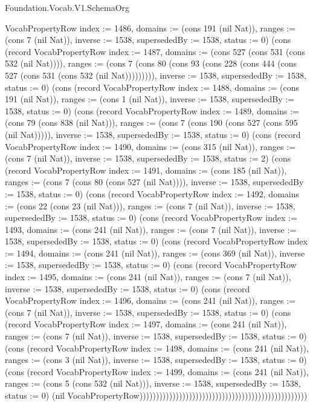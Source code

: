 \begin{lexlean}{Foundation.Vocab.V1.SchemaOrg}
\begin{semanticmodule}
{VocabPropertyRow {index := 1486, domains := (cons 191 (nil Nat)), ranges := (cons 7 (nil Nat)), inverse := 1538, supersededBy := 1538, status := 0}) (cons (record VocabPropertyRow {index := 1487, domains := (cons 527 (cons 531 (cons 532 (nil Nat)))), ranges := (cons 7 (cons 80 (cons 93 (cons 228 (cons 444 (cons 527 (cons 531 (cons 532 (nil Nat))))))))), inverse := 1538, supersededBy := 1538, status := 0}) (cons (record VocabPropertyRow {index := 1488, domains := (cons 191 (nil Nat)), ranges := (cons 1 (nil Nat)), inverse := 1538, supersededBy := 1538, status := 0}) (cons (record VocabPropertyRow {index := 1489, domains := (cons 79 (cons 838 (nil Nat))), ranges := (cons 7 (cons 190 (cons 527 (cons 595 (nil Nat))))), inverse := 1538, supersededBy := 1538, status := 0}) (cons (record VocabPropertyRow {index := 1490, domains := (cons 315 (nil Nat)), ranges := (cons 7 (nil Nat)), inverse := 1538, supersededBy := 1538, status := 2}) (cons (record VocabPropertyRow {index := 1491, domains := (cons 185 (nil Nat)), ranges := (cons 7 (cons 80 (cons 527 (nil Nat)))), inverse := 1538, supersededBy := 1538, status := 0}) (cons (record VocabPropertyRow {index := 1492, domains := (cons 22 (cons 23 (nil Nat))), ranges := (cons 7 (nil Nat)), inverse := 1538, supersededBy := 1538, status := 0}) (cons (record VocabPropertyRow {index := 1493, domains := (cons 241 (nil Nat)), ranges := (cons 7 (nil Nat)), inverse := 1538, supersededBy := 1538, status := 0}) (cons (record VocabPropertyRow {index := 1494, domains := (cons 241 (nil Nat)), ranges := (cons 369 (nil Nat)), inverse := 1538, supersededBy := 1538, status := 0}) (cons (record VocabPropertyRow {index := 1495, domains := (cons 241 (nil Nat)), ranges := (cons 7 (nil Nat)), inverse := 1538, supersededBy := 1538, status := 0}) (cons (record VocabPropertyRow {index := 1496, domains := (cons 241 (nil Nat)), ranges := (cons 7 (nil Nat)), inverse := 1538, supersededBy := 1538, status := 0}) (cons (record VocabPropertyRow {index := 1497, domains := (cons 241 (nil Nat)), ranges := (cons 7 (nil Nat)), inverse := 1538, supersededBy := 1538, status := 0}) (cons (record VocabPropertyRow {index := 1498, domains := (cons 241 (nil Nat)), ranges := (cons 3 (nil Nat)), inverse := 1538, supersededBy := 1538, status := 0}) (cons (record VocabPropertyRow {index := 1499, domains := (cons 241 (nil Nat)), ranges := (cons 5 (cons 532 (nil Nat))), inverse := 1538, supersededBy := 1538, status := 0}) (nil VocabPropertyRow)))))))))))))))))))))))))))))))))))))))))))))))))))
}


\end{semanticmodule}
\end{lexlean}
